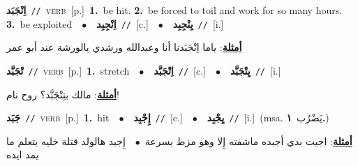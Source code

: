 \documentclass[10pt,a4paper,twoside]{article} %
\begin{document}
\begin{multicols}{2}
{\setlength\topsep{0pt}\textbf{\foreignlanguage{arabic}{اِنْجَبَد}}\ {\color{gray}\texttt{//}\color{black}}\ \textsc{verb}\ [p.]\ \textbf{1.}~be hit.  \textbf{2.}~be forced to toil and work for so many hours.  \textbf{3.}~be exploited\ \ $\bullet$\ \ \setlength\topsep{0pt}\textbf{\foreignlanguage{arabic}{اِنْجِبِد}}\ {\color{gray}\texttt{//}\color{black}}\ [c.]\ \ $\bullet$\ \ \setlength\topsep{0pt}\textbf{\foreignlanguage{arabic}{يِنْجِبِد}}\ {\color{gray}\texttt{//}\color{black}}\ [i.]\  \begin{flushright}\color{gray}\foreignlanguage{arabic}{\textbf{\underline{\foreignlanguage{arabic}{أمثلة}}}: ياما اِنْجَبَدنا أنا وعبدالله ورشدي بالورشة عند أبو عمر}\end{flushright}\color{black}} \vspace{2mm}

{\setlength\topsep{0pt}\textbf{\foreignlanguage{arabic}{تْجَبَّد}}\ {\color{gray}\texttt{//}\color{black}}\ \textsc{verb}\ [p.]\ \textbf{1.}~stretch\ \ $\bullet$\ \ \setlength\topsep{0pt}\textbf{\foreignlanguage{arabic}{اِتْجَبَّد}}\ {\color{gray}\texttt{//}\color{black}}\ [c.]\ \ $\bullet$\ \ \setlength\topsep{0pt}\textbf{\foreignlanguage{arabic}{يِتْجَبَّد}}\ {\color{gray}\texttt{//}\color{black}}\ [i.]\  \begin{flushright}\color{gray}\foreignlanguage{arabic}{\textbf{\underline{\foreignlanguage{arabic}{أمثلة}}}: مالك بتِتْجَبَّد؟ روح نام!}\end{flushright}\color{black}} \vspace{2mm}

{\setlength\topsep{0pt}\textbf{\foreignlanguage{arabic}{جَبَد}}\ {\color{gray}\texttt{//}\color{black}}\ \textsc{verb}\ [p.]\ \textbf{1.}~hit\ \ $\bullet$\ \ \setlength\topsep{0pt}\textbf{\foreignlanguage{arabic}{إِجْبِد}}\ {\color{gray}\texttt{//}\color{black}}\ [c.]\ \ $\bullet$\ \ \setlength\topsep{0pt}\textbf{\foreignlanguage{arabic}{يِجْبِد}}\ {\color{gray}\texttt{//}\color{black}}\ [i.]\ \color{gray}(msa. \foreignlanguage{arabic}{يَضْرُب}~\foreignlanguage{arabic}{\textbf{١.}})\color{black}\  \begin{flushright}\color{gray}\foreignlanguage{arabic}{\textbf{\underline{\foreignlanguage{arabic}{أمثلة}}}: اجيت بدي أجبده ماشفته إِلا وهو مزط بسرعة\ $\bullet$\ \  إِجبد هالولد قتلة خليه يتعلم ما يمد ايده}\end{flushright}\color{black}} \vspace{2mm}


\end{multicols}
\end{document}
